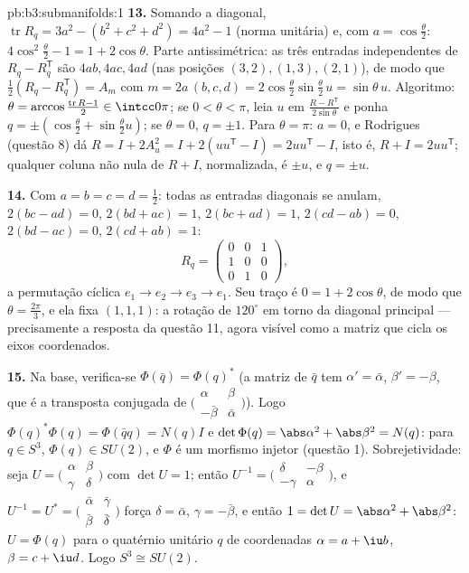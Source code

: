 \begin{solution}{pb:b3:submanifolds:1}
\textbf{13.} Somando a diagonal, $\operatorname{tr}R_q =
3a^2 - (b^2 + c^2 + d^2) = 4a^2 - 1$ (norma unitária) e, com
$a = \cos\frac\theta2$: $4\cos^2\frac\theta2 - 1 = 1 +
2\cos\theta$. Parte antissimétrica: as três entradas independentes
de $R_q - R_q^{\mathsf T}$ são $4ab, 4ac, 4ad$ (nas
posições $(3,2), (1,3), (2,1)$), de modo que $\frac12(R_q -
R_q^{\mathsf T}) = A_m$ com $m = 2a\,(b, c, d) =
2\cos\frac\theta2\sin\frac\theta2\,u = \sin\theta\,u$.
Algoritmo: $\theta = \arccos\frac{\operatorname{tr}R -
1}{2} \in \intcc0\pi$; se $0 < \theta < \pi$, leia $u$ em
$\frac{R - R^{\mathsf T}}{2\sin\theta}$ e ponha $q =
\pm(\cos\frac\theta2 + \sin\frac\theta2 u)$; se $\theta =
0$, $q = \pm1$. Para $\theta = \pi$: $a = 0$, e Rodrigues
(questão 8) dá $R = I + 2A_u^2 = I + 2(uu^{\mathsf T} -
I) = 2uu^{\mathsf T} - I$, isto é, $R + I = 2uu^{\mathsf T}$;
qualquer coluna não nula de $R + I$, normalizada, é $\pm u$, e
$q = \pm u$.

\textbf{14.} Com $a = b = c = d = \frac12$: todas as entradas
diagonais se anulam, $2(bc - ad) = 0$, $2(bd + ac) = 1$, $2(bc +
ad) = 1$, $2(cd - ab) = 0$, $2(bd - ac) = 0$, $2(cd + ab) =
1$:
\[
R_q = \begin{pmatrix} 0 & 0 & 1\\ 1 & 0 & 0\\ 0 & 1 & 0
\end{pmatrix},
\]
a permutação cíclica $e_1 \to e_2 \to e_3 \to e_1$. Seu
traço é $0 = 1 + 2\cos\theta$, de modo que $\theta = \frac{2\pi}3$,
e ela fixa $(1,1,1)$: a rotação de $120^\circ$ em torno da
diagonal principal --- precisamente a resposta da questão 11, agora
visível como a matriz que cicla os eixos coordenados.

\textbf{15.} Na base, verifica-se $\Phi(\bar q) =
\Phi(q)^*$ (a matriz de $\bar q$ tem $\alpha' =
\bar\alpha$, $\beta' = -\beta$, que é a transposta
conjugada de $\bigl(\begin{smallmatrix}\alpha & \beta\\
-\bar\beta & \bar\alpha\end{smallmatrix}\bigr)$). Logo
$\Phi(q)^*\Phi(q) = \Phi(\bar qq) = N(q)I$ e $\det\Phi(q)
= \abs\alpha^2 + \abs\beta^2 = N(q)$: para $q \in S^3$,
$\Phi(q) \in SU(2)$, e $\Phi$ é um morfismo injetor
(questão 1). Sobrejetividade: seja $U =
\bigl(\begin{smallmatrix}\alpha & \beta\\ \gamma &
\delta\end{smallmatrix}\bigr)$ com $\det U = 1$; então
$U^{-1} = \bigl(\begin{smallmatrix}\delta & -\beta\\
-\gamma & \alpha\end{smallmatrix}\bigr)$, e $U^{-1} = U^*
= \bigl(\begin{smallmatrix}\bar\alpha & \bar\gamma\\
\bar\beta & \bar\delta\end{smallmatrix}\bigr)$ força
$\delta = \bar\alpha$, $\gamma = -\bar\beta$, e então $1 =
\det U = \abs\alpha^2 + \abs\beta^2$: $U = \Phi(q)$ para o
quatérnio unitário $q$ de coordenadas $\alpha = a + \iu b$,
$\beta = c + \iu d$. Logo $S^3 \cong SU(2)$.


\end{solution}
